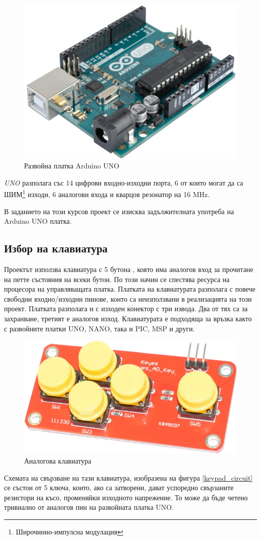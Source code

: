 \documentclass[titlepage, oneside, 14pt]{extbook}
\newcommand{\ard}{Arduino\texttrademark{}}
\begin{document}
\begin{figure}[!htbp]
    \centering
    \includegraphics[width=0.5\linewidth]{img/arduino.png}
    \caption{Развойна платка \ard{} UNO}
\end{figure}

\textit{UNO} разполага със 14 цифрови входно-изходни порта, 6 от които могат да
са ШИМ\footnote{Широчинно-импулсна модулация} изходи, 6 аналогови входа и
кварцов резонатор на 16 MHz.

В заданието на този курсов проект се изисква задължителната употреба на \ard{} UNO
платка.

\subsection{Избор на клавиатура}

Проектът използва клавиатура с 5 бутона \cite{keypads}, която има аналогов вход за
прочитане на петте състояния на всеки бутон. По този начин се спестява ресурса
на процесора на управляващата платка. Платката на клавиатурата разполага с повече свободни входно/изходни
пинове, които са неизползвани в реализацията на този проект. Платката
разполага и с изходен конектор с три извода. Два от тях са за захранване, третият
е аналогов изход. Клавиатурата е подходяща за връзка както с развойните платки
UNO, NANO, така и PIC, MSP и други.

\begin{figure}[!htbp]
    \centering
    \includegraphics[width=0.5\linewidth]{img/keypad.png}
    \caption{Аналогова клавиатура}
\end{figure}

Схемата на свързване на тази клавиатура, изобразена на фигура \ref{keypad_circuit} се състои от 5 ключа, които, ако са затворени,
дават успоредно свързаните резистори на късо, променяйки изходното напрежение. То може
да бъде четено тривиално от аналогов пин на развойната платка UNO.
\end{document}
